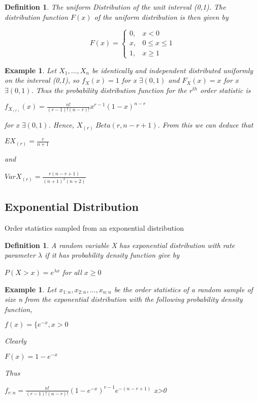\documentclass[11pt,a4paper]{article}
\theoremstyle{plain}
\newtheorem{de}[fact]{Definition}
\newtheorem{exmp}[fact]{Example}
\begin{document}
\begin{de}
The uniform Distribution of the unit interval (0,1). The distribution function $F(x)$ of the uniform distribution is then given by 
\begin{center}
 \[
     F(x)=\left\{
                \begin{array}{ll}
                  0,&\text{$x<0$}\\
                  x,&\text {$0\leq x \leq 1$}\\
                  1, &\text{$x\geq 1$}
                \end{array}
              \right.
 \]
 \end{center}
\end{de}

\begin{exmp}

Let $X_1,...,X_n$ be identically and independent distributed uniformly on the interval (0,1), so $f_X(x)=1$ for x $\exists (0,1)$ and $F_X(x)=x$ for x $\exists (0,1)$. Thus the probability distribution function for the $r^{th}$ order statistic is
\begin{center}
$f_{X_{(r)}}(x)=\frac{n!}{(r-1)!(n-r)!}x^{r-1}(1-x)^{n-r}$
\end{center}
for x $\exists (0,1)$. 
\newline Hence, $X_{(r)}~Beta(r,n-r+1)$. From this we can deduce that
\begin{center}
$EX_{(r)}=\frac{r}{n+1}$
\end{center}
and 
\begin{center}
$VarX_{(r)}=\frac{r(n-r+1)}{(n+1)^2(n+2)}$
\end{center}
\end{exmp} 



\subsection*{Exponential Distribution}
Order statistics sampled from an exponential distribution


\begin{de}
A random variable X has exponential distribution with rate parameter $\lambda$ if it has probability density function give by
\begin{center}
$P(X>x)=e^{\lambda x}$ for all $x\geq 0$
\end{center}
\end{de}
\begin{exmp}
Let $x_{1:n}, x_{2:n},...,x_{n:n}$ be the order statistics of a random sample of size n from the exponential distribution with the following probability density function,
\begin{center}
$f(x)=\{e^{-x}, x>0$
\end{center}
Clearly
\begin{center}
$F(x)=1-e^{-x}$
\end{center}
Thus
\begin{center}
$f_{r:n}=\frac{n!}{(r-1)!(n-r)!}(1-e^{-x})^{r-1}e^{-(n-r+1)}$ x>0
\end{center}
\end{exmp}
 
\end{document}
